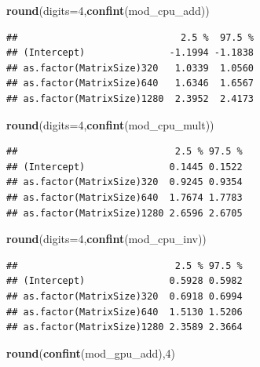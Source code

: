 \documentclass[
]{article}
\newenvironment{Shaded}{\begin{snugshade}}{\end{snugshade}}
\newcommand{\DataTypeTok}[1]{\textcolor[rgb]{0.13,0.29,0.53}{#1}}
\newcommand{\DecValTok}[1]{\textcolor[rgb]{0.00,0.00,0.81}{#1}}
\newcommand{\KeywordTok}[1]{\textcolor[rgb]{0.13,0.29,0.53}{\textbf{#1}}}
\newcommand{\NormalTok}[1]{#1}
\begin{document}
\begin{Shaded}
\begin{Highlighting}[]
\KeywordTok{round}\NormalTok{(}\DataTypeTok{digits=}\DecValTok{4}\NormalTok{,}\KeywordTok{confint}\NormalTok{(mod\_cpu\_add))}
\end{Highlighting}
\end{Shaded}

\begin{verbatim}
##                             2.5 %  97.5 %
## (Intercept)               -1.1994 -1.1838
## as.factor(MatrixSize)320   1.0339  1.0560
## as.factor(MatrixSize)640   1.6346  1.6567
## as.factor(MatrixSize)1280  2.3952  2.4173
\end{verbatim}

\begin{Shaded}
\begin{Highlighting}[]
\KeywordTok{round}\NormalTok{(}\DataTypeTok{digits=}\DecValTok{4}\NormalTok{,}\KeywordTok{confint}\NormalTok{(mod\_cpu\_mult))}
\end{Highlighting}
\end{Shaded}

\begin{verbatim}
##                            2.5 % 97.5 %
## (Intercept)               0.1445 0.1522
## as.factor(MatrixSize)320  0.9245 0.9354
## as.factor(MatrixSize)640  1.7674 1.7783
## as.factor(MatrixSize)1280 2.6596 2.6705
\end{verbatim}

\begin{Shaded}
\begin{Highlighting}[]
\KeywordTok{round}\NormalTok{(}\DataTypeTok{digits=}\DecValTok{4}\NormalTok{,}\KeywordTok{confint}\NormalTok{(mod\_cpu\_inv))}
\end{Highlighting}
\end{Shaded}

\begin{verbatim}
##                            2.5 % 97.5 %
## (Intercept)               0.5928 0.5982
## as.factor(MatrixSize)320  0.6918 0.6994
## as.factor(MatrixSize)640  1.5130 1.5206
## as.factor(MatrixSize)1280 2.3589 2.3664
\end{verbatim}

\begin{Shaded}
\begin{Highlighting}[]
\KeywordTok{round}\NormalTok{(}\KeywordTok{confint}\NormalTok{(mod\_gpu\_add),}\DecValTok{4}\NormalTok{)}
\end{Highlighting}
\end{Shaded}
\end{document}
